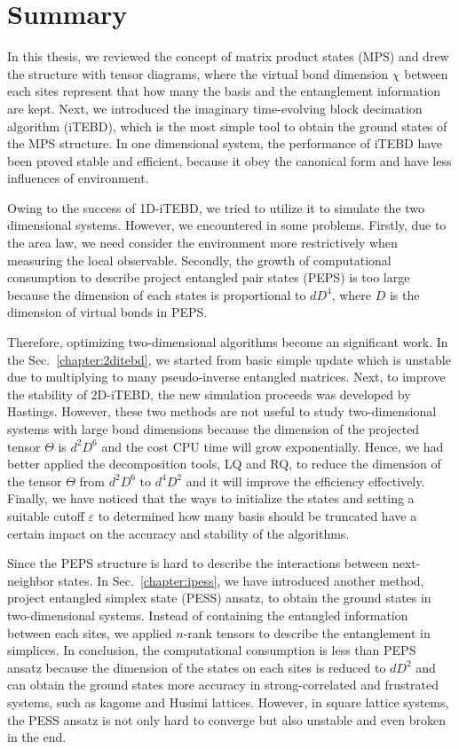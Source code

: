 \chapter{Summary}
\label{chapter:summary}

In this thesis, we reviewed the concept of matrix product states (MPS) and drew the structure with tensor diagrams, where the virtual bond dimension $\chi$ between each sites represent that how many the basis and the entanglement information are kept. Next, we introduced the imaginary time-evolving block decimation algorithm (iTEBD), which is the most simple tool to obtain the ground states of the MPS structure. In one dimensional system, the performance of iTEBD have been proved stable and efficient, because it obey the canonical form and have less influences of environment. 

Owing to the success of 1D-iTEBD, we tried to utilize it to simulate the two dimensional systems. However, we encountered in some problems. Firstly, due to the area law, we need consider the environment more restrictively when measuring the local observable. Secondly, the growth of computational consumption to describe project entangled pair states (PEPS) is too large because the dimension of each states is proportional to $dD^4$, where $D$ is the dimension of virtual bonds in PEPS.

Therefore, optimizing two-dimensional algorithms become an significant work. In the Sec.~\ref{chapter:2ditebd}, we started from basic simple update which is unstable due to multiplying to many pseudo-inverse entangled matrices. Next, to improve the stability of 2D-iTEBD, the new simulation proceeds was developed by Hastings. However, these two methods are not useful to study two-dimensional systems with large bond dimensions because the dimension of the projected tensor $\Theta$ is $d^2D^6$ and the cost CPU time will grow exponentially. Hence, we had better applied the decomposition tools, LQ and RQ, to reduce the dimension of the tensor $\Theta$ from $d^2D^6$ to $d^4D^2$ and it will improve the efficiency effectively. Finally, we have noticed that the ways to initialize the states and setting a suitable cutoff $\varepsilon$ to determined how many basis should be truncated have a certain impact on the accuracy and stability of the algorithms. 

Since the PEPS structure is hard to describe the interactions between next-neighbor states. In Sec.~\ref{chapter:ipess}, we have introduced another method, project entangled simplex state (PESS) ansatz, to obtain the ground states in two-dimensional systems. Instead of containing the entangled information between each sites, we applied $n$-rank tensors to describe the entanglement in simplices. In conclusion, the computational consumption is less than PEPS ansatz because the dimension of the states on each sites is reduced to $dD^2$ and can obtain the ground states more accuracy in strong-correlated and frustrated systems, such as kagome and Husimi lattices. However, in square lattice systems, the PESS ansatz is not only hard to converge but also unstable and even broken in the end.

